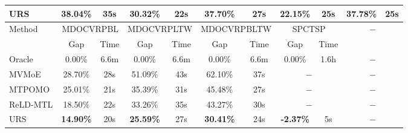 \documentclass{article}
\theoremstyle{plain}
\theoremstyle{definition}
\theoremstyle{remark}
\begin{document}
\begin{table}[htbp]
{\begin{tabular}{l|cc|cc|cc|cc|cc}
    URS   & 38.04\% & 35s   & \cellcolor[HTML]{D0CECE}\textbf{30.32\%} & 22s   & \cellcolor[HTML]{D0CECE}\textbf{37.70\%} & 27s   & 22.15\% & \multicolumn{1}{c|}{25s} & \cellcolor[HTML]{D0CECE}\textbf{37.78\%} & \multicolumn{1}{c}{25s} \\
    \midrule
    \midrule
    \multirow{2}[2]{*}{Method} & \multicolumn{2}{c|}{MDOCVRPBL} & \multicolumn{2}{c|}{MDOCVRPLTW} & \multicolumn{2}{c|}{MDOCVRPBLTW} & \multicolumn{2}{c|}{SPCTSP} & \multicolumn{2}{c}{\multirow{2}[2]{*}{$-$}}  \\
          & Gap   & Time  & Gap   & Time  & Gap   & Time  & Gap   & Time       &       &  \\
    \midrule
    Oracle & 0.00\% & 6.6m  & 0.00\% & 6.6m  & 0.00\% & 6.6m   & 0.00\% & 1.6h & \multicolumn{2}{c}{$-$} \\
    MVMoE & 28.70\% & 28s   & 51.09\% & 43s   & 62.10\% & 37s   & \multicolumn{2}{c|}{$-$} & \multicolumn{2}{c}{$-$} \\
    MTPOMO & 25.01\% & 21s   & 35.39\% & 31s   & 45.48\% & 27s   & \multicolumn{2}{c|}{$-$} & \multicolumn{2}{c}{$-$} \\
    ReLD-MTL & 18.50\% & 22s   & 33.26\% & 35s   & 43.27\% & 30s   & \multicolumn{2}{c|}{$-$} & \multicolumn{2}{c}{$-$} \\
    URS   & \cellcolor[HTML]{D0CECE}\textbf{14.90\%} & 20s   & \cellcolor[HTML]{D0CECE}\textbf{25.59\%} & 27s   & \cellcolor[HTML]{D0CECE}\textbf{30.41\%} & 24s   & \cellcolor[HTML]{D0CECE}\textbf{-2.37\%} &5s & \multicolumn{2}{c}{$-$} \\
    \bottomrule[0.5mm]
    \end{tabular}%
    }
  \label{tab:all_exp_existing_problems}%
\end{table}%
\end{document}
